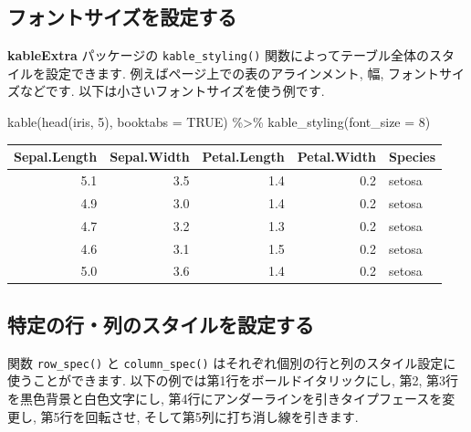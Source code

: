 \documentclass[
  11pt,
]{bxjsreport}
\newenvironment{Shaded}{\begin{snugshade}}{\end{snugshade}}
\newcommand{\AttributeTok}[1]{\textcolor[rgb]{0.77,0.63,0.00}{#1}}
\newcommand{\ConstantTok}[1]{\textcolor[rgb]{0.00,0.00,0.00}{#1}}
\newcommand{\DecValTok}[1]{\textcolor[rgb]{0.00,0.00,0.81}{#1}}
\newcommand{\FunctionTok}[1]{\textcolor[rgb]{0.00,0.00,0.00}{#1}}
\newcommand{\NormalTok}[1]{#1}
\newcommand{\SpecialCharTok}[1]{\textcolor[rgb]{0.00,0.00,0.00}{#1}}
\begin{document}
\hypertarget{set-the-font-size}{%
\subsection{フォントサイズを設定する}\label{set-the-font-size}}

\textbf{kableExtra} パッケージの \texttt{kable\_styling()} 関数によってテーブル全体のスタイルを設定できます. 例えばページ上での表のアラインメント, 幅, フォントサイズなどです. 以下は小さいフォントサイズを使う例です.

\begin{Shaded}
\begin{Highlighting}[numbers=left,,]
\FunctionTok{kable}\NormalTok{(}\FunctionTok{head}\NormalTok{(iris, }\DecValTok{5}\NormalTok{), }\AttributeTok{booktabs =} \ConstantTok{TRUE}\NormalTok{) }\SpecialCharTok{\%\textgreater{}\%}
  \FunctionTok{kable\_styling}\NormalTok{(}\AttributeTok{font\_size =} \DecValTok{8}\NormalTok{)}
\end{Highlighting}
\end{Shaded}

\begin{table}[H]
\centering\begingroup\fontsize{8}{10}\selectfont

\begin{tabular}{rrrrl}
\toprule
Sepal.Length & Sepal.Width & Petal.Length & Petal.Width & Species\\
\midrule
5.1 & 3.5 & 1.4 & 0.2 & setosa\\
4.9 & 3.0 & 1.4 & 0.2 & setosa\\
4.7 & 3.2 & 1.3 & 0.2 & setosa\\
4.6 & 3.1 & 1.5 & 0.2 & setosa\\
5.0 & 3.6 & 1.4 & 0.2 & setosa\\
\bottomrule
\end{tabular}
\endgroup{}
\end{table}

\hypertarget{style-specific-rows-columns}{%
\subsection{特定の行・列のスタイルを設定する}\label{style-specific-rows-columns}}

関数 \texttt{row\_spec()} と \texttt{column\_spec()} はそれぞれ個別の行と列のスタイル設定に使うことができます. 以下の例では第1行をボールドイタリックにし, 第2, 第3行を黒色背景と白色文字にし, 第4行にアンダーラインを引きタイプフェースを変更し, 第5行を回転させ, そして第5列に打ち消し線を引きます.
\end{document}
